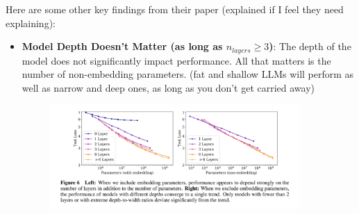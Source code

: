 \documentclass[12pt]{article}
\begin{document}
Here are some other key findings from their paper (explained if I feel they need explaining):
\begin{itemize}
\item \textbf{Model Depth Doesn't Matter (as long as \(n_{layers}\geq 3\))}: The depth of the model does not significantly impact performance. All that matters is the number of non-embedding parameters. (fat and shallow LLMs will perform as well as narrow and deep ones, as long as you don't get carried away) 

\begin{figure}[H]
    \centering
    \includegraphics[width=0.9\textwidth]{./depth_performance.png} %
\end{figure}


\end{itemize}
\end{document}
